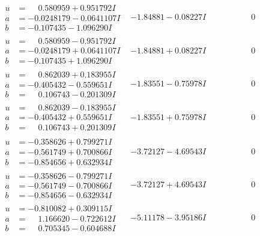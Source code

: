 \documentclass[1p]{elsarticle_modified}
\theoremstyle{definition}
\begin{document}
$$\begin{array}{c|c|c}
\begin{aligned}
u &= \phantom{-}0.580959 + 0.951792 I \\
a &= -0.0248179 - 0.0641107 I \\
b &= -0.107435 - 1.096290 I\end{aligned}
 & -1.84881 - 0.08227 I & \phantom{-0.000000 } 0 \\ \hline\begin{aligned}
u &= \phantom{-}0.580959 - 0.951792 I \\
a &= -0.0248179 + 0.0641107 I \\
b &= -0.107435 + 1.096290 I\end{aligned}
 & -1.84881 + 0.08227 I & \phantom{-0.000000 } 0 \\ \hline\begin{aligned}
u &= \phantom{-}0.862039 + 0.183955 I \\
a &= -0.405432 - 0.559651 I \\
b &= \phantom{-}0.106743 - 0.201309 I\end{aligned}
 & -1.83551 - 0.75978 I & \phantom{-0.000000 } 0 \\ \hline\begin{aligned}
u &= \phantom{-}0.862039 - 0.183955 I \\
a &= -0.405432 + 0.559651 I \\
b &= \phantom{-}0.106743 + 0.201309 I\end{aligned}
 & -1.83551 + 0.75978 I & \phantom{-0.000000 } 0 \\ \hline\begin{aligned}
u &= -0.358626 + 0.799271 I \\
a &= -0.561749 + 0.700866 I \\
b &= -0.854656 + 0.632934 I\end{aligned}
 & -3.72127 - 4.69543 I & \phantom{-0.000000 } 0 \\ \hline\begin{aligned}
u &= -0.358626 - 0.799271 I \\
a &= -0.561749 - 0.700866 I \\
b &= -0.854656 - 0.632934 I\end{aligned}
 & -3.72127 + 4.69543 I & \phantom{-0.000000 } 0 \\ \hline\begin{aligned}
u &= -0.810082 + 0.309115 I \\
a &= \phantom{-}1.166620 - 0.722612 I \\
b &= \phantom{-}0.705345 - 0.604688 I\end{aligned}
 & -5.11178 - 3.95186 I & \phantom{-0.000000 } 0 \\ \hline\begin{aligned}

\end{aligned}
\end{array}$$
\end{document}
